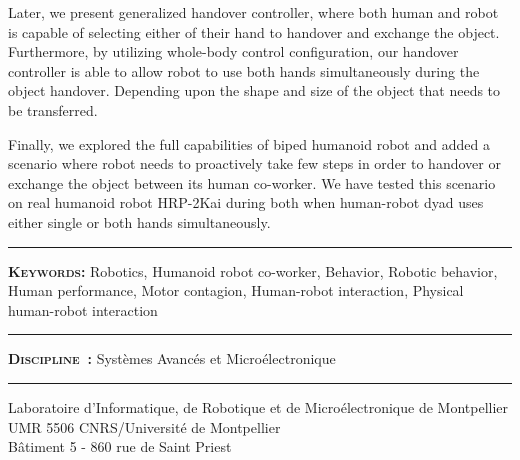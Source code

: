 Later, we present generalized handover controller, where both human and robot is capable of selecting either of their hand to handover and exchange the object. Furthermore, by utilizing whole-body control configuration, our handover controller is able to allow robot to use both hands simultaneously during the object handover. Depending upon the shape and size of the object that needs to be transferred.

Finally, we explored the full capabilities of biped humanoid robot and added a scenario where robot needs to proactively take few steps in order to handover or exchange the object between its human co-worker. We have tested this scenario on real humanoid robot HRP-2Kai during both when human-robot dyad uses either single or both hands simultaneously.







\vspace{3pt}\hrule\vspace{3pt}
\noindent \textbf{\textsc{Keywords:}}
Robotics, Humanoid robot co-worker, Behavior, Robotic behavior, Human performance, Motor contagion, Human-robot interaction, Physical human-robot interaction
\noindent \vspace{3pt}\hrule\vspace{3pt}
\noindent \textbf{\textsc{Discipline~:}}
Syst\`emes Avanc\'es et Micro\'electronique
\noindent \vspace{3pt}\hrule\vspace{3pt}
\noindent Laboratoire d'Informatique, de Robotique et de Micro\'electronique de Montpellier\\
UMR 5506 CNRS/Universit\'e de Montpellier\\
B\^atiment 5 - 860 rue de Saint Priest
